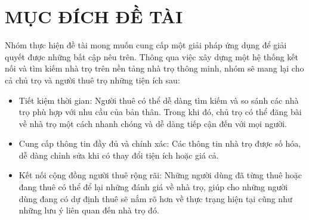 \section{MỤC ĐÍCH ĐỀ TÀI}
Nhóm thực hiện đề tài mong muốn cung cấp một giải pháp ứng dụng để giải quyết được những bất cập nêu trên. Thông qua việc xây dựng một hệ thống kết nối và tìm kiếm nhà trọ trên nền tảng nhà trọ thông minh, nhóm sẽ mang lại cho cả chủ trọ và người thuê trọ những tiện ích sau:
\begin{itemize}
    \item Tiết kiệm thời gian: Người thuê có thể dễ dàng tìm kiếm và so sánh các nhà trọ phù hợp với nhu cầu của bản thân. Trong khi đó, chủ trọ có thể đăng bài về nhà trọ một cách nhanh chóng và dễ dàng tiếp cận đến với mọi người.
    \item Cung cấp thông tin đầy đủ và chính xác: Các thông tin nhà trọ được số hóa, dễ dàng chỉnh sửa khi có thay đổi tiện ích hoặc giá cả.
    \item Kết nối cộng đồng người thuê rộng rãi: Những người dùng đã từng thuê hoặc đang thuê có thể để lại những đánh giá về nhà trọ, giúp cho những người dùng đang có dự định thuê sẽ nắm rõ hơn về thực trạng hiện tại cũng như những lưu ý liên quan đến nhà trọ đó.
\end{itemize}